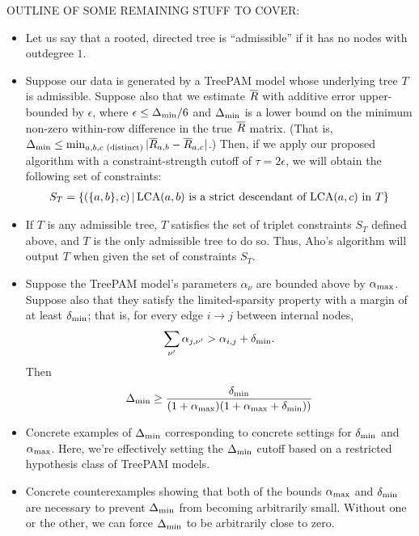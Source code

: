 \documentclass{article}
\theoremstyle{definition}
\begin{document}
OUTLINE OF SOME REMAINING STUFF TO COVER:
\begin{itemize}
\item Let us say that a rooted, directed tree is ``admissible'' if it has no nodes with outdegree $1$.
%
\item Suppose our data is generated by a TreePAM model whose underlying tree $T$ is admissible.
Suppose also that we estimate $\overline{R}$ with additive error upper-bounded by $\epsilon$, where $\epsilon \leq \Delta_{\text{min}}/6$ and $\Delta_{\text{min}}$ is a lower bound on the minimum non-zero within-row difference in the true $\overline{R}$ matrix.
(That is, $\Delta_{\text{min}} \leq \min_{a,b,c \text{ (distinct)}} |\overline{R}_{a,b} - \overline{R}_{a,c}|$.)
Then, if we apply our proposed algorithm with a constraint-strength cutoff of $\tau = 2\epsilon$, we will obtain the following set of constraints:
\begin{align*}
S_T = \{ (\{a,b\},c) \,|\, \text{LCA}(a,b) \text{ is a strict descendant of } \text{LCA}(a,c) \text{ in } T \}
\end{align*}
%
\item If $T$ is any admissible tree, $T$ satisfies the set of triplet constraints $S_T$ defined above, and $T$ is the only admissible tree to do so.
Thus, Aho's algorithm will output $T$ when given the set of constraints $S_T$.
%
\item Suppose the TreePAM model's parameters $\alpha_\nu$ are bounded above by $\alpha_{\text{max}}$.
Suppose also that they satisfy the limited-sparsity property with a margin of at least $\delta_{\text{min}}$; that is, for every edge $i \to j$ between internal nodes,
\begin{align*}
\sum_{\nu'} \alpha_{j,\nu'} > \alpha_{i,j} + \delta_{\text{min}}.
\end{align*}
Then
\begin{align*}
\Delta_{\text{min}} \geq \frac{\delta_{\text{min}}}{(1+\alpha_{\text{max}})(1+\alpha_{\text{max}}+\delta_{\text{min}}))}
\end{align*}
%
\item Concrete examples of $\Delta_{\text{min}}$ corresponding to concrete settings for $\delta_{\text{min}}$ and $\alpha_{\text{max}}$.  Here, we're effectively setting the $\Delta_{\text{min}}$ cutoff based on a restricted hypothesis class of TreePAM models.
%
\item Concrete counterexamples showing that both of the bounds $\alpha_{\text{max}}$ and $\delta_{\text{min}}$ are necessary to prevent $\Delta_{\text{min}}$ from becoming arbitrarily small.
Without one or the other, we can force $\Delta_{\text{min}}$ to be arbitrarily close to zero.
\end{itemize}
\end{document}

